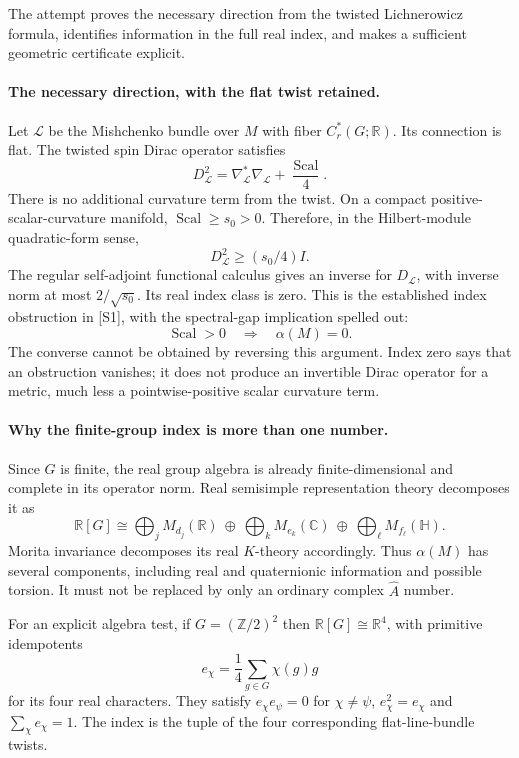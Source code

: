 \documentclass[11pt]{article}
\begin{document}
The attempt proves the necessary direction from the twisted
Lichnerowicz formula, identifies information in the full real index,
and makes a sufficient geometric certificate explicit.

\paragraph{The necessary direction, with the flat twist retained.}
Let $\mathcal L$ be the Mishchenko bundle over $M$ with fiber
$C_r^*(G;\mathbb R)$. Its connection is flat. The twisted
spin Dirac operator satisfies
\[
                  D_{\mathcal L}^2
       =\nabla_{\mathcal L}^*\nabla_{\mathcal L}
                                  +\frac{\operatorname{Scal}}4.
\]
There is no additional curvature term from the twist.
On a compact positive-scalar-curvature manifold,
$\operatorname{Scal}\geq s_0>0$. Therefore, in the
Hilbert-module quadratic-form sense,
\[
             D_{\mathcal L}^2\geq(s_0/4)I.
\]
The regular self-adjoint functional calculus gives
an inverse for $D_{\mathcal L}$, with inverse norm
at most $2/\sqrt{s_0}$. Its real index class is
zero. This is the established index obstruction
in [S1], with the spectral-gap implication spelled
out:
\[
              \operatorname{Scal}>0\quad\Longrightarrow
                                      \quad\alpha(M)=0.
\]
The converse cannot be obtained by reversing
this argument. Index zero says that an obstruction
vanishes; it does not produce an invertible
Dirac operator for a metric, much less a
pointwise-positive scalar curvature term.

\paragraph{Why the finite-group index is more than one number.}
Since $G$ is finite, the real group algebra is already
finite-dimensional and complete in its operator norm.
Real semisimple representation theory decomposes it as
\[
 \mathbb R[G]\cong
 \bigoplus_jM_{d_j}(\mathbb R)\ \oplus\
 \bigoplus_kM_{e_k}(\mathbb C)\ \oplus\
 \bigoplus_\ell M_{f_\ell}(\mathbb H).
\]
Morita invariance decomposes its real $K$-theory
accordingly. Thus $\alpha(M)$ has several
components, including real and quaternionic
information and possible torsion. It must not
be replaced by only an ordinary complex
$\widehat A$ number.

For an explicit algebra test, if $G=(\mathbb Z/2)^2$
then $\mathbb R[G]\cong\mathbb R^4$, with primitive
idempotents
\[
 e_\chi=\frac14\sum_{g\in G}\chi(g)g
\]
for its four real characters. They satisfy
$e_\chi e_\psi=0$ for $\chi\ne\psi$,
$e_\chi^2=e_\chi$ and $\sum_\chi e_\chi=1$.
The index is the tuple of the four corresponding
flat-line-bundle twists.
\end{document}
